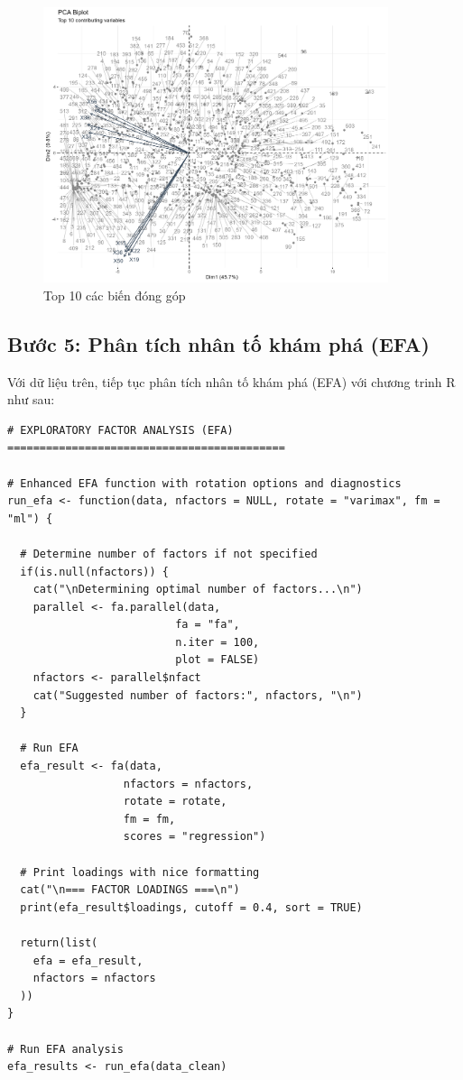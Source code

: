 \begin{figure}[h!]
    \includegraphics[width=0.9\textwidth]{../../assets/images/SP43.png}
    \caption{Top 10 các biến đóng góp}
    \label{fig:contributions}
\end{figure}

\subsection{Bước 5: Phân tích nhân tố khám phá (EFA)}

Với dữ liệu trên, tiếp tục phân tích nhân tố khám phá (EFA) với chương trinh R như sau:

\begin{lstlisting}
# EXPLORATORY FACTOR ANALYSIS (EFA) ===========================================

# Enhanced EFA function with rotation options and diagnostics
run_efa <- function(data, nfactors = NULL, rotate = "varimax", fm = "ml") {
  
  # Determine number of factors if not specified
  if(is.null(nfactors)) {
    cat("\nDetermining optimal number of factors...\n")
    parallel <- fa.parallel(data, 
                          fa = "fa",
                          n.iter = 100,
                          plot = FALSE)
    nfactors <- parallel$nfact
    cat("Suggested number of factors:", nfactors, "\n")
  }
  
  # Run EFA
  efa_result <- fa(data, 
                  nfactors = nfactors,
                  rotate = rotate,
                  fm = fm,
                  scores = "regression")
  
  # Print loadings with nice formatting
  cat("\n=== FACTOR LOADINGS ===\n")
  print(efa_result$loadings, cutoff = 0.4, sort = TRUE)
  
  return(list(
    efa = efa_result,
    nfactors = nfactors
  ))
}

# Run EFA analysis
efa_results <- run_efa(data_clean)
\end{lstlisting}

